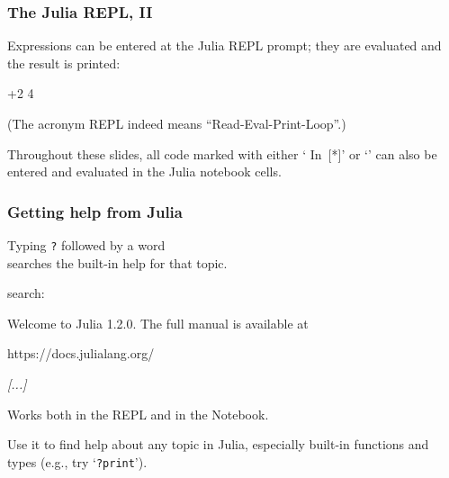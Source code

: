 \documentclass[english,serif,mathserif,xcolor=pdftex,dvipsnames,table]{beamer}
\begin{document}
\begin{frame}
  \frametitle{The Julia REPL, II}
  \smaller

  Expressions can be entered at the Julia REPL prompt; they are evaluated and the
  result is printed:
\begin{semiverbatim}
+2
4
\end{semiverbatim}

  \+
  (The acronym REPL indeed means ``Read-Eval-Print-Loop''.)

  \+ Throughout these slides, all code marked with either `{\color{blue}
    In~[*]}' or `\julia\hspace{-1.2ex}' can also be entered and evaluated in the Julia
  notebook cells.
\end{frame}


\begin{frame}[fragile]
  \frametitle{Getting help from Julia}
  Typing \texttt{?} followed by a word \\ searches the built-in help for
  that topic.
\begin{semiverbatim}\smaller
{}
\Out
search:

  Welcome to Julia 1.2.0. The full manual is available at

  https://docs.julialang.org/

  {\itshape [...]}
\end{semiverbatim}

  Works both in the REPL and in the Notebook.

  \+ Use it to find help about any topic in Julia, especially built-in
  functions and types (e.g., try `\texttt{?print}').
\end{frame}
\end{document}

